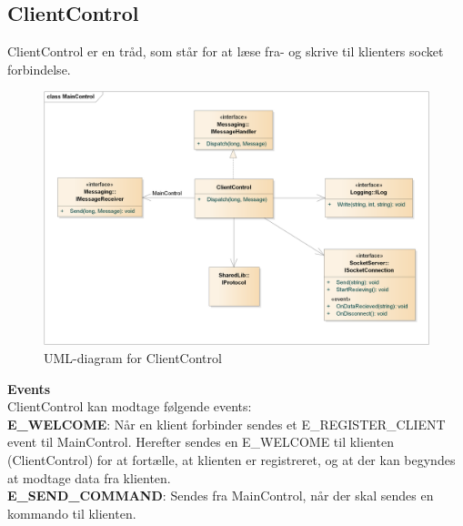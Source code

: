 \subsection{ClientControl}
ClientControl er en tråd, som står for at læse fra- og skrive til klienters socket forbindelse.


\begin{figure}[H]
    \centering
    \includegraphics[width=1\textwidth]{Systemdesign/CentralServer/Images/ClientControl.png}
    \caption{UML-diagram for ClientControl}
    \label{fig:CSClientControl}
\end{figure}


\textbf{Events}\\
ClientControl kan modtage følgende events:\\

\textbf{E\_WELCOME}:
Når en klient forbinder sendes et E\_REGISTER\_CLIENT event til MainControl. Herefter sendes en E\_WELCOME til klienten (ClientControl) for at fortælle, at klienten er registreret, og at der kan begyndes at modtage data fra klienten.\\

\textbf{E\_SEND\_COMMAND}:
Sendes fra MainControl, når der skal sendes en kommando til klienten.\\